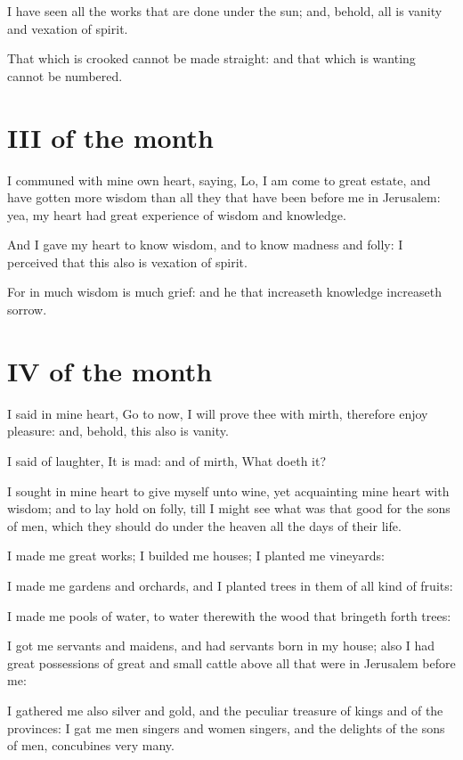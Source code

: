 I have seen all the works that are done under the sun; and, behold, all is vanity and vexation of spirit.

That which is crooked cannot be made straight: and that which is wanting cannot be numbered.

\section{III of the month}

I communed with mine own heart, saying, Lo, I am come to great estate, and have gotten more wisdom than all they that have been before me in Jerusalem: yea, my heart had great experience of wisdom and knowledge.

And I gave my heart to know wisdom, and to know madness and folly: I perceived that this also is vexation of spirit.

For in much wisdom is much grief: and he that increaseth knowledge increaseth sorrow.

\section{IV of the month}

I said in mine heart, Go to now, I will prove thee with mirth, therefore enjoy pleasure: and, behold, this also is vanity.

I said of laughter, It is mad: and of mirth, What doeth it?

I sought in mine heart to give myself unto wine, yet acquainting mine heart with wisdom; and to lay hold on folly, till I might see what was that good for the sons of men, which they should do under the heaven all the days of their life.

I made me great works; I builded me houses; I planted me vineyards:

I made me gardens and orchards, and I planted trees in them of all kind of fruits:

I made me pools of water, to water therewith the wood that bringeth forth trees:

I got me servants and maidens, and had servants born in my house; also I had great possessions of great and small cattle above all that were in Jerusalem before me:

\verseamended I gathered me also silver and gold, and the peculiar treasure of kings and of the provinces: I gat me men singers and women singers, and the delights of the sons of men, concubines very many.

